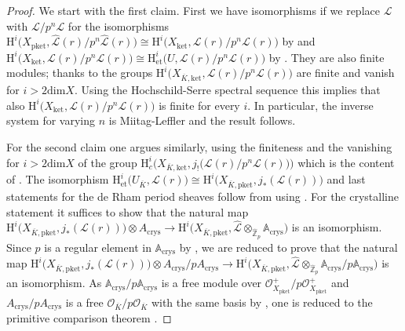 \documentclass[asterisque,english]{smfart}
\begin{document}
\begin{proof} We start with the first claim. First  we have isomorphisms if we replace $\mathcal{L}$ with $\mathcal{L}/p^n \mathcal{L}$ for the isomorphisms $\mathrm{H}^i\bigl(X_{\mathrm{pket}}, \widehat{\mathcal{L}}(r)/p^n  \widehat{\mathcal{L}}(r) \bigr)\cong \mathrm{H}^i\bigl(X_{\mathrm{ket}}, \mathcal{L}(r)/p^n \mathcal{L}(r)\bigr) $ by \cite[Prop. 5.1.7]{DLLZa}   and  $ \mathrm{H}^i\bigl(X_{\mathrm{ket}}, \mathcal{L}(r)/p^n \mathcal{L}(r)\bigr) \cong  \mathrm{H}^i_{\mathrm{et}}\bigl(U, \mathcal{L}(r)/p^n \mathcal{L}(r)\bigr)$ by \cite[Cor. 4.6.7]{DLLZa}. They are also finite modules;  thanks to \cite[Thm. 6.2.1]{DLLZa} the groups $ \mathrm{H}^i\bigl(X_{\overline{K},\mathrm{ket}}, \mathcal{L}(r)/p^n \mathcal{L}(r)\bigr)$ are finite and vanish for $i> 2 \mathrm{dim}X$. Using the  Hochschild-Serre spectral sequence this implies that also   $\mathrm{H}^i\bigl(X_{\mathrm{ket}}, \mathcal{L}(r)/p^n \mathcal{L}(r)\bigr)$ is finite for every $i$. In particular, the inverse system for varying $n$ is Miitag-Leffler and the result follows.

For the second claim one argues similarly, using the finiteness and the vanishing for $i> 2 \mathrm{dim}X$ of the group $\mathrm{H}^i_c\bigl(X_{\overline{K},\mathrm{ket}}, j_!\bigl(\mathcal{L}(r)/p^n \mathcal{L}(r)\bigr)\bigr)$ which is the content of \cite[Thm. 2.3.5]{LLZ}.
The isomorphism $\mathrm{H}^i_{\mathrm{et}}\bigl(U_{\overline{K}},  \mathcal{L}(r)\bigr)\cong \mathrm{H}^i\bigl(X_{\overline{K},\mathrm{pket}},  j_\ast(\mathcal{L}(r))\bigr)$ and last statements for the de Rham period sheaves follow from \cite[Lemma 3.6.1]{DLLZb} using \cite[Thm 6.2.1 \& Cor. 6.3.4]{DLLZa}. For the crystalline statement it suffices to show that the natural map $\mathrm{H}^i\bigl(X_{\overline{K},\mathrm{pket}},  j_\ast(\mathcal{L}(r))\bigr)\otimes A_{\mathrm{crys}}  \to\mathrm{H}^i\bigl(X_{\overline{K},\mathrm{pket}},\widehat{\mathcal{L}}\otimes_{\widehat{\mathbb{Z}}_p} \mathbb{A}_{\mathrm{crys}}\bigr) $ is an isomorphism. Since $p$ is a regular element in $\mathbb{A}_{\mathrm{crys}}$ by \cite[Cor.~3.27]{AI}, we are reduced to prove that the natural map $\mathrm{H}^i\bigl(X_{\overline{K},\mathrm{pket}},  j_\ast(\mathcal{L}(r))\bigr)\otimes A_{\mathrm{crys}}/p A_{\mathrm{crys}} \to\mathrm{H}^i\bigl(X_{\overline{K},\mathrm{pket}},\widehat{\mathcal{L}}\otimes_{\widehat{\mathbb{Z}}_p} \mathbb{A}_{\mathrm{crys}}/p \mathbb{A}_{\mathrm{crys}}\bigr) $ is an isomorphism.  As  $\mathbb{A}_{\mathrm{crys}}/p \mathbb{A}_{\mathrm{crys}}$ is a free module over $\mathcal{O}_{X_{\mathrm{pket}}}^+/p \mathcal{O}_{X_{\mathrm{pket}}}^+$ and $A_{\mathrm{crys}}/p A_{\mathrm{crys}}$ is a free $\mathcal{O}_{\overline{K}}/p \mathcal{O}_{\overline{K}} $ with the same basis by \cite[Cor.~3.24]{AI}, one is reduced to the primitive comparison theorem \cite[Thm 6.2.1]{DLLZa}. 




\end{proof}
\end{document}
